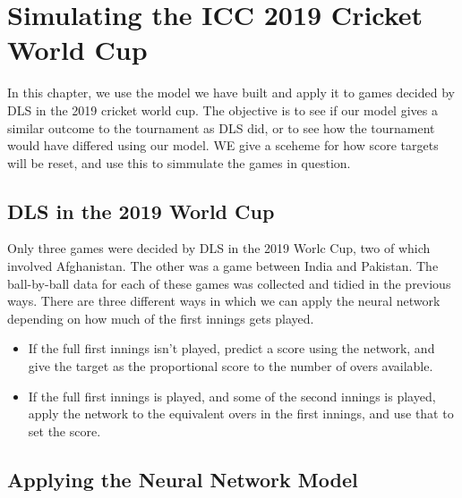\chapter{Simulating the ICC 2019 Cricket World Cup}
In this chapter, we use the model we have built and apply it to games decided by DLS in the 2019 cricket world cup. The objective is to see if our model 
gives a similar outcome to the tournament as DLS did, or to see how the tournament would have differed using our model. WE give a sceheme for how score targets will
be reset, and use this to simmulate the games in question. 

\section{DLS in the 2019 World Cup}
Only three games were decided by DLS in the 2019 Worlc Cup, two of which involved Afghanistan. The other was a game between India and Pakistan. The ball-by-ball data for 
each of these games was collected and tidied in the previous ways. There are three different ways in which we can apply the neural network depending on how much of the first innings gets played.

\begin{itemize}
    \item If the full first innings isn't played, predict a score using the network, and give the target as the proportional score to the number of overs available. 
    \item If the full first innings is played, and some of the second innings is played, apply the network to the equivalent overs in the first innings, and use that to set the score. 
\end{itemize}


\section{Applying the Neural Network Model}
